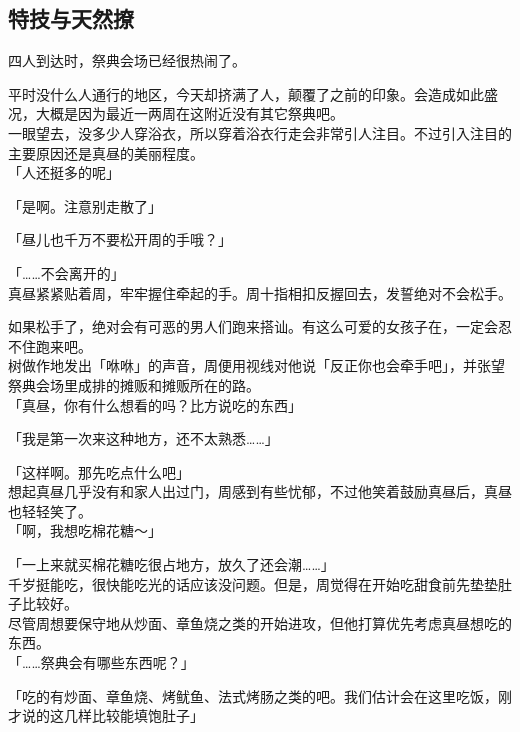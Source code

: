 \subsection{特技与天然撩}

四人到达时，祭典会场已经很热闹了。

平时没什么人通行的地区，今天却挤满了人，颠覆了之前的印象。会造成如此盛况，大概是因为最近一两周在这附近没有其它祭典吧。\\

一眼望去，没多少人穿浴衣，所以穿着浴衣行走会非常引人注目。不过引入注目的主要原因还是真昼的美丽程度。\\

「人还挺多的呢」

「是啊。注意别走散了」

「昼儿也千万不要松开周的手哦？」

「……不会离开的」\\

真昼紧紧贴着周，牢牢握住牵起的手。周十指相扣反握回去，发誓绝对不会松手。

如果松手了，绝对会有可恶的男人们跑来搭讪。有这么可爱的女孩子在，一定会忍不住跑来吧。\\

树做作地发出「咻咻」的声音，周便用视线对他说「反正你也会牵手吧」，并张望祭典会场里成排的摊贩和摊贩所在的路。\\

「真昼，你有什么想看的吗？比方说吃的东西」

「我是第一次来这种地方，还不太熟悉……」

「这样啊。那先吃点什么吧」\\

想起真昼几乎没有和家人出过门，周感到有些忧郁，不过他笑着鼓励真昼后，真昼也轻轻笑了。\\

「啊，我想吃棉花糖～」

「一上来就买棉花糖吃很占地方，放久了还会潮……」\\

千岁挺能吃，很快能吃光的话应该没问题。但是，周觉得在开始吃甜食前先垫垫肚子比较好。\\

尽管周想要保守地从炒面、章鱼烧之类的开始进攻，但他打算优先考虑真昼想吃的东西。\\

「……祭典会有哪些东西呢？」

「吃的有炒面、章鱼烧、烤鱿鱼、法式烤肠之类的吧。我们估计会在这里吃饭，刚才说的这几样比较能填饱肚子」

